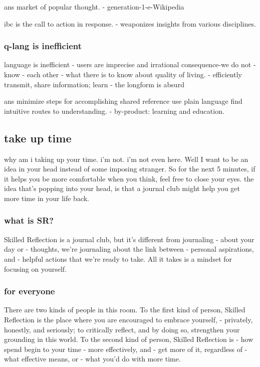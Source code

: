 \documentclass[
]{book}
\begin{document}
ans
market of popular thought.
- generation-1-e-Wikipedia

ibc is the call to action in response.
- weaponizes insights from various disciplines.

\hypertarget{q-lang-is-inefficient}{%
\subsubsection{q-lang is inefficient}\label{q-lang-is-inefficient}}

language is inefficient
- users are imprecise and irrational
consequence-we do not
- know
- each other
- what there is to know about quality of living.
- efficiently transmit, share information; learn
- the longform is absurd

ans
minimize steps for accomplishing shared reference
use plain language
find intuitive routes to understanding.
- by-product: learning and education.

\hypertarget{take-up-time}{%
\subsection{take up time}\label{take-up-time}}

why am i taking up your time.
i'm not.
i'm not even here.
Well I want to be an idea in your head
instead of some imposing stranger.
So for the next 5 minutes,
if it helps you be more comfortable
when you think,
feel free to close your eyes.
the idea that's popping into your head,
is that a journal club might help you
get more time in your life back.

\hypertarget{what-is-sr}{%
\subsubsection{what is SR?}\label{what-is-sr}}

Skilled Reflection is a journal club,
but it's different from journaling
- about your day or
- thoughts, we're journaling about the link between
- personal aspirations, and
- helpful actions that we're ready to take.
All it takes is a mindset
for focusing on yourself.

\hypertarget{for-everyone}{%
\subsubsection{for everyone}\label{for-everyone}}

There are two kinds of people in this room.
To the first kind of person,
Skilled Reflection is the place
where you are encouraged
to embrace yourself,
- privately, honestly, and seriously;
to critically reflect,
and by doing so,
strengthen your grounding in this world.
To the second kind of person,
Skilled Reflection is
- how spend begin to your time
- more effectively, and
- get more of it, regardless of
- what effective means, or
- what you'd do with more time.
\end{document}
